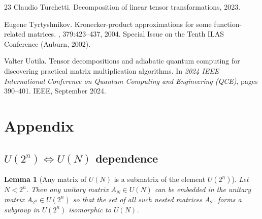 \documentclass[a4paper, openany, 12pt]{article}
\newtheorem{lemma}{Lemma}
\theoremstyle{remark}
\theoremstyle{definition}
\begin{document}
\begin{thebibliography}{23}
Claudio Turchetti.
\newblock Decomposition of linear tensor transformations, 2023.

Eugene Tyrtyshnikov.
\newblock Kronecker-product approximations for some function-related matrices.
, 379:423--437, 2004.
\newblock Special Issue on the Tenth ILAS Conference (Auburn, 2002).

Valter Uotila.
\newblock Tensor decompositions and adiabatic quantum computing for discovering
  practical matrix multiplication algorithms.
\newblock In {\em 2024 IEEE International Conference on Quantum Computing and
  Engineering (QCE)}, pages 390--401. IEEE, September 2024.

\end{thebibliography}    %
    \newpage
\section{Appendix}
\newcommand{\qnum}[1]{\left[#1\right]}
\newcommand{\brak}[1]{\left\langle #1 \right\rangle}
\newcommand{\A}{\mathcal{A}}
\newcommand{\SU}{\operatorname{SU}}


\subsection{$U(2^n)\Leftrightarrow U(N)$ dependence\label{sec:suNtosu2n}}

\begin{lemma}[Any matrix of $U(N)$ is a submatrix of the element $U(2^n)$]
Let $N < 2^n$. Then any unitary matrix $A_N\in U(N)$ can be embedded in the unitary matrix $A_{2^n}\in U(2^n)$ so that the set of all such nested matrices $A_{2^n}$ forms a subgroup in $U(2^n)$ isomorphic to $U(N)$.
\end{lemma}
\end{document}
